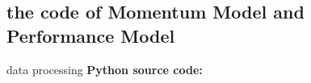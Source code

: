 \documentclass{mcmthesis}  %
\begin{document}
\newpage
\newpage
\printbibliography  %




\newpage
\newpage
\begin{appendices}  %
\section{the code of Momentum Model and Performance Model}  %

data processing
\textbf{Python source code:}



% 

\end{appendices}  %
\end{document}
